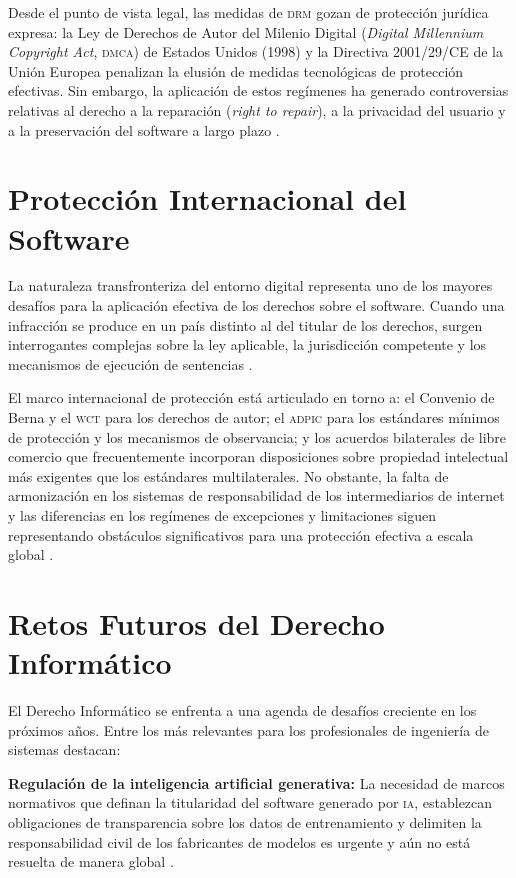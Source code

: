 \documentclass[11pt,a4paper]{report}
\begin{document}
Desde el punto de vista legal, las medidas de \textsc{drm} gozan de protección jurídica expresa: la Ley de Derechos de Autor del Milenio Digital (\textit{Digital Millennium Copyright Act}, \textsc{dmca}) de Estados Unidos (1998) y la Directiva 2001/29/CE de la Unión Europea penalizan la elusión de medidas tecnológicas de protección efectivas. Sin embargo, la aplicación de estos regímenes ha generado controversias relativas al derecho a la reparación (\textit{right to repair}), a la privacidad del usuario y a la preservación del software a largo plazo \citep{euipo2022, ompi2024}.

\section{Protección Internacional del Software}

La naturaleza transfronteriza del entorno digital representa uno de los mayores desafíos para la aplicación efectiva de los derechos sobre el software. Cuando una infracción se produce en un país distinto al del titular de los derechos, surgen interrogantes complejas sobre la ley aplicable, la jurisdicción competente y los mecanismos de ejecución de sentencias \citep{ompi2024}.

El marco internacional de protección está articulado en torno a: el Convenio de Berna y el \textsc{wct} para los derechos de autor; el \textsc{adpic} para los estándares mínimos de protección y los mecanismos de observancia; y los acuerdos bilaterales de libre comercio que frecuentemente incorporan disposiciones sobre propiedad intelectual más exigentes que los estándares multilaterales. No obstante, la falta de armonización en los sistemas de responsabilidad de los intermediarios de internet y las diferencias en los regímenes de excepciones y limitaciones siguen representando obstáculos significativos para una protección efectiva a escala global \citep{omc1994, ompi1996}.

\section{Retos Futuros del Derecho Informático}

El Derecho Informático se enfrenta a una agenda de desafíos creciente en los próximos años. Entre los más relevantes para los profesionales de ingeniería de sistemas destacan:

\textbf{Regulación de la inteligencia artificial generativa:} La necesidad de marcos normativos que definan la titularidad del software generado por \textsc{ia}, establezcan obligaciones de transparencia sobre los datos de entrenamiento y delimiten la responsabilidad civil de los fabricantes de modelos es urgente y aún no está resuelta de manera global \citep{ompi2024, openai2025}.
\end{document}
